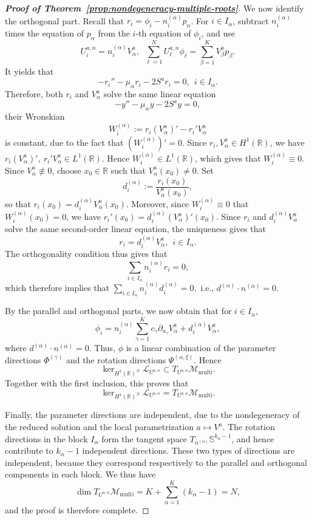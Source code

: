 \documentclass[11pt]{article}
\numberwithin{equation}{section}
\theoremstyle{definition}
\begin{document}
\begin{proof}[\normalfont\bfseries Proof of Theorem~\ref{prop:nondegeneracy-multiple-roots}]
We now identify the orthogonal part. Recall that \(r_i=\phi_i-n_i^{(\alpha)}p_\alpha\). For \(i\in I_\alpha\), subtract
\(n_i^{(\alpha)}\) times the equation of \(p_\alpha\) from the \(i\)-th
equation of \(\phi_i\), and use
\[
U_i^{a,n}=n_i^{(\alpha)}V_\alpha^a,
\ \
\sum_{\ell=1}^N U_\ell^{a,n}\phi_\ell
=
\sum_{\beta=1}^K V_\beta^a p_\beta.
\]
It yields that
\[
-r_i''
-\mu_\alpha r_i
-2S^{a} r_i
=0,
\ \  i\in I_\alpha .
\]
Therefore, both \(r_i\) and \(V_\alpha^a\) solve the same linear equation
\[
-y''
-\mu_\alpha y
-2S^a y=0,
\]
their Wronskian
\[
W_i^{(\alpha)}
:=
r_i(V_\alpha^a)'-r_i'V_\alpha^a
\]
is constant, due to the fact that $(W_i^{(\alpha)})'=0$. Since \(r_i,V_\alpha^a\in H^1(\mathbb R)\), we have
$
r_i(V^a_\alpha)',\ r_i'V_\alpha^a\in L^1(\mathbb R).
$
Hence \(W_i^{(\alpha)}\in L^1(\mathbb R)\), which gives that
\(
W_i^{(\alpha)}\equiv0.
\)
Since \(V^a_\alpha\not\equiv0\), choose \(x_0\in\mathbb R\) such that
$
V^a_\alpha(x_0)\neq0.
$
Set
\[
d_i^{(\alpha)}:=\frac{r_i(x_0)}{V^a_\alpha(x_0)},
\]
so that
$
r_i(x_0)=d_i^{(\alpha)}V^a_\alpha(x_0).
$
Moreover, since $W_i^{(\alpha)}\equiv0$ that  \(W_i^{(\alpha)}(x_0)=0\), we have
$
r_i'(x_0)=d_i^{(\alpha)}(V^a_\alpha)'(x_0).
$
Since \(r_i\) and \(d_i^{(\alpha)}V^a_\alpha\) solve the same second-order
linear equation,  the uniqueness gives that
\[
r_i=d_i^{(\alpha)}V^a_\alpha,
\ \  i\in I_\alpha.
\]
The orthogonality condition thus gives that
\[
\sum_{i\in I_\alpha}n_i^{(\alpha)}r_i=0,
\]
which therefore implies that
$
\sum_{i\in I_\alpha}n_i^{(\alpha)}d_i^{(\alpha)}=0,
$
i.e.,
$
d^{(\alpha)}\cdot n^{(\alpha)}=0.
$


By the parallel and orthogonal parts, we now obtain that for \(i\in I_\alpha\),
\[
\phi_i
=
n_i^{(\alpha)}
\sum_{\gamma=1}^K c_\gamma \partial_{a_\gamma}V^a_\alpha
+
d_i^{(\alpha)}V^a_\alpha,
\]
where
$
d^{(\alpha)}\cdot n^{(\alpha)}=0.
$
Thus, \(\phi\) is a linear combination of the parameter directions
\(\Phi^{(\gamma)}\) and the rotation directions
\(\Psi^{(\alpha,\xi)}\). Hence
\[
\ker_{H^1(\mathbb R)^N}\mathcal L_{U^{a,n}}
\subset
T_{U^{a,n}}\mathcal M_{\mathrm{multi}}.
\]
Together with the first inclusion, this proves that
\[
\ker_{H^1(\mathbb R)^N}\mathcal L_{U^{a,n}}
=
T_{U^{a,n}}\mathcal M_{\mathrm{multi}}.
\]



Finally, the parameter directions are independent, due to the nondegeneracy
of the reduced solution and the local parametrization \(a\mapsto V^a\).
The rotation directions in the block \(I_\alpha\) form the tangent space
\(T_{n^{(\alpha)}}\mathbb S^{k_\alpha-1}\), and hence contribute to
\(k_\alpha-1\) independent directions. These two types of directions are
independent, because they correspond respectively to the parallel and
orthogonal components in each block. We thus have
\[
\dim T_{U^{a,n}}\mathcal M_{\mathrm{multi}}
=
K+\sum_{\alpha=1}^K(k_\alpha-1)
=
N,
\]
and the proof is therefore complete.
\end{proof}
\end{document}
